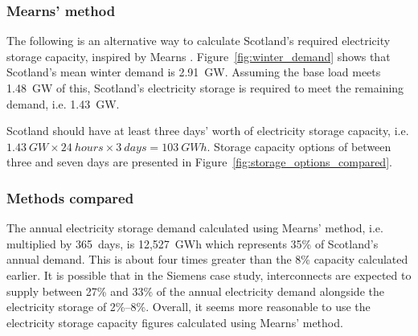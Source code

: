 \subsubsection{Mearns' method}

The following is an alternative way to calculate Scotland's required electricity storage capacity, inspired by Mearns \citep{Mearns2018}.
Figure~\ref{fig:winter_demand} shows that Scotland's mean winter demand is 2.91~GW.
Assuming the base load meets 1.48~GW of this, Scotland's electricity storage is required to meet the remaining demand, i.e. 1.43~GW.

Scotland should have at least three days' worth of electricity storage capacity, i.e. $1.43~GW \times 24~hours \times 3~days = 103~GWh$.
Storage capacity options of between three and seven days are presented in Figure~\ref{fig:storage_options_compared}.



\subsubsection{Methods compared}

The annual electricity storage demand calculated using Mearns' method, i.e. multiplied by 365~days, is 12,527~GWh which represents 35\% of Scotland's annual demand.
This is about four times greater than the 8\% capacity calculated earlier.
It is possible that in the Siemens case study, interconnects are expected to supply between 27\% and 33\% of the annual electricity demand alongside the electricity storage of 2\%--8\%.
Overall, it seems more reasonable to use the electricity storage capacity figures calculated using Mearns' method.






